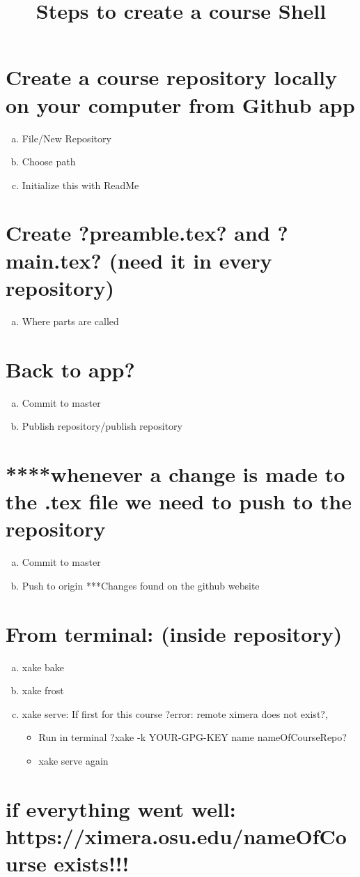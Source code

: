 \documentclass{ximera}
\title{Steps to create a course Shell }
\begin{document}
\begin{abstract}
\end{abstract}
\maketitle

\section{Create a course repository locally on your computer from Github app}
\begin{enumerate}[a.]
\item File/New Repository
\item	Choose path
\item Initialize this with ReadMe
\end{enumerate}

\section{Create ?preamble.tex? and ?main.tex? (need it in every repository)}
\begin{enumerate}[a.]
\item Where parts are called
\end{enumerate}

\section{Back to app?}
\begin{enumerate}[a.]
\item Commit to master
\item Publish repository/publish repository   
\end{enumerate}

\section{****whenever a change is made to the .tex file we need to push to the repository}
\begin{enumerate}[a.]
\item Commit to master
\item Push to origin ***Changes found on the github website
\end{enumerate}

\section{From terminal: (inside repository)}
\begin{enumerate}[a.]
\item xake bake
\item	xake frost
\item	xake serve: If first for this course ?error: remote ximera does not exist?,  
\begin{itemize}
\item Run in terminal ?xake -k YOUR-GPG-KEY name nameOfCourseRepo?
\item xake serve again
\end{itemize}
\end{enumerate}

\section{if everything went well: https://ximera.osu.edu/nameOfCourse exists!!!}
\end{document}

